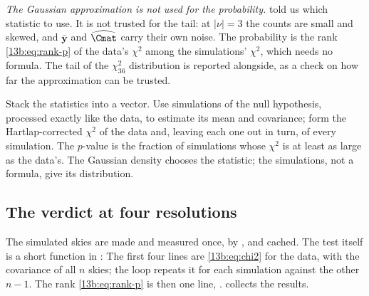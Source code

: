 \emph{The Gaussian approximation is not used for the probability.}  told us which statistic to use.
It is not trusted for the tail: at $|\nu|=3$ the counts are small and skewed, and $\bar{\bm y}$ and $\widehat{\Cmat}$
carry their own noise. The probability is the rank \eqref{13b:eq:rank-p} of the data's $\chi^2$ among the
simulations' $\chi^2$, which needs no formula. The tail of the $\chi^2_{36}$ distribution is reported alongside, as a
check on how far the approximation can be trusted.

\begin{keyidea}
Stack the statistics into a vector. Use simulations of the null hypothesis, processed exactly like the data, to
estimate its mean and covariance; form the Hartlap-corrected $\chi^2$ of the data and, leaving each one out in
turn, of every simulation. The $p$-value is the fraction of simulations whose $\chi^2$ is at least as large as the
data's. The Gaussian density chooses the statistic; the simulations, not a formula, give its distribution.
\end{keyidea}

\subsection{The verdict at four resolutions}
\label{13b:sec:verdict}

The simulated skies are made and measured once, by , and cached. The test itself is a
short function in :
\noindent The first four lines are \eqref{13b:eq:chi2} for the data, with the covariance of all $n$ skies; the
loop repeats it for each simulation against the other $n-1$. The rank \eqref{13b:eq:rank-p} is then one line,
.  collects the results.

